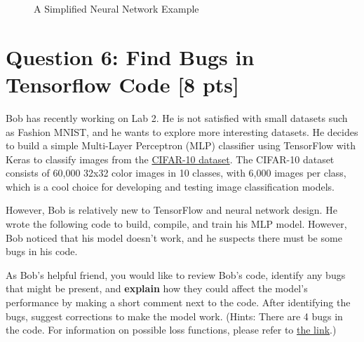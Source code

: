\documentclass[12pt]{article}
\begin{document}
\begin{figure}[h!]
    \caption{A Simplified Neural Network Example}
    \label{fig:NNPipe}
\end{figure}

\newpage
\section*{Question 6: Find Bugs in Tensorflow Code [8 pts]}

Bob has recently working on Lab 2. He is not satisfied with small datasets such as Fashion MNIST, and he wants to explore more interesting datasets. He decides to build a simple Multi-Layer Perceptron (MLP) classifier using TensorFlow with Keras to classify images from the \href{https://www.cs.toronto.edu/~kriz/cifar.html}{CIFAR-10 dataset}. The CIFAR-10 dataset consists of 60,000 32x32 color images in 10 classes, with 6,000 images per class, which is a cool choice for developing and testing image classification models.

However, Bob is relatively new to TensorFlow and neural network design. He wrote the following code to build, compile, and train his MLP model. However, Bob noticed that his model doesn't work, and he suspects there must be some bugs in his code.

As Bob's helpful friend, you would like to review Bob's code, identify any bugs that might be present, and \textbf{explain} how they could affect the model's performance by making a short comment next to the code. After identifying the bugs, suggest corrections to make the model work. (Hints: There are 4 bugs in the code. For information on possible loss functions, please refer to \href{https://keras.io/api/losses/}{the link}.)
\end{document}

